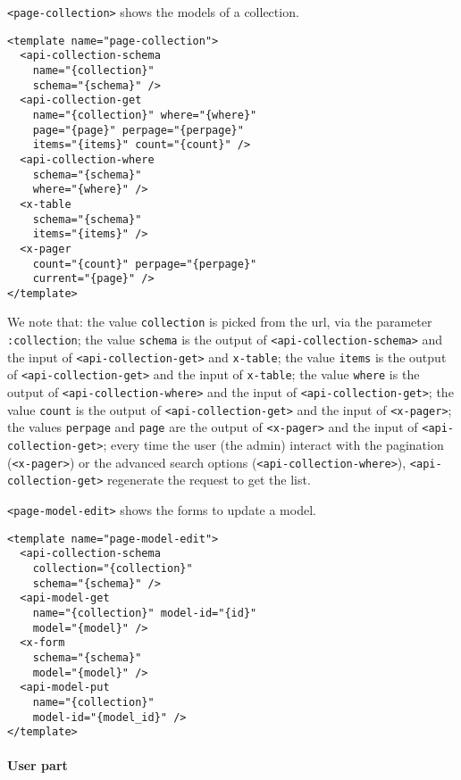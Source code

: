 \vspace{0.2cm}

\texttt{<page-collection>} shows the models of a collection.

\begin{lstlisting}[language=HTML5]
<template name="page-collection">
  <api-collection-schema
    name="{collection}"
    schema="{schema}" />
  <api-collection-get 
    name="{collection}" where="{where}" 
    page="{page}" perpage="{perpage}"  
    items="{items}" count="{count}" />
  <api-collection-where 
    schema="{schema}"
    where="{where}" />
  <x-table 
    schema="{schema}"
    items="{items}" />
  <x-pager 
    count="{count}" perpage="{perpage}"
    current="{page}" />
</template>
\end{lstlisting}

We note that: 
the value \texttt{collection} is picked from the url, via the parameter \texttt{:collection};
the value \texttt{schema} is the output of \texttt{<api-collection-schema>} and the input of \texttt{<api-collection-get>} and \texttt{x-table};
the value \texttt{items} is the output of \texttt{<api-collection-get>} and the input of \texttt{x-table};
the value \texttt{where} is the output of \texttt{<api-collection-where>} and the input of \texttt{<api-collection-get>};
the value \texttt{count} is the output of \texttt{<api-collection-get>} and the input of \texttt{<x-pager>};
the values \texttt{perpage} and \texttt{page} are the output of \texttt{<x-pager>} and the input of \texttt{<api-collection-get>};
every time the user (the admin) interact with the pagination (\texttt{<x-pager>}) or the advanced search options (\texttt{<api-collection-where>}), \texttt{<api-collection-get>} regenerate the request to get the list.

\vspace{0.2cm}

\texttt{<page-model-edit>} shows the forms to update a model.

\begin{lstlisting}[language=HTML5]
<template name="page-model-edit">
  <api-collection-schema
    collection="{collection}"
    schema="{schema}" />
  <api-model-get 
    name="{collection}" model-id="{id}"
    model="{model}" />
  <x-form 
    schema="{schema}" 
    model="{model}" />
  <api-model-put 
    name="{collection}"
    model-id="{model_id}" />
</template>
\end{lstlisting}

\paragraph{User part}

